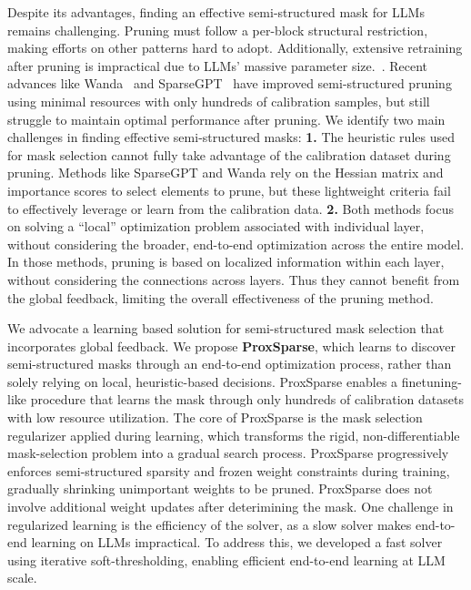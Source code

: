 Despite its advantages, finding an effective semi-structured mask for LLMs remains challenging. Pruning must follow a per-block structural restriction, making efforts on other patterns hard to adopt. Additionally, extensive retraining after pruning is impractical due to LLMs' massive parameter size.~\cite{ma2023llm}. Recent advances like Wanda~\cite{sun2023simple} and SparseGPT~\cite{frantar2023sparsegpt} have improved semi-structured pruning using minimal resources with only hundreds of calibration samples, but still struggle to maintain optimal performance after pruning. 
We identify two main challenges in finding effective semi-structured masks: \textbf{1.} The heuristic rules used for mask selection cannot fully take advantage of the calibration dataset during pruning. Methods like SparseGPT and Wanda rely on the Hessian matrix and importance scores to select elements to prune, but these lightweight criteria fail to effectively leverage or learn from the calibration data. \textbf{2.} Both methods focus on solving a ``local'' optimization problem associated with individual layer, without considering the broader, end-to-end optimization across the entire model. In those methods, pruning is based on localized information within each layer, without considering the connections across layers. Thus they cannot benefit from the global feedback, limiting the overall effectiveness of the pruning method.

We advocate a learning based solution for semi-structured mask selection that incorporates global feedback. We propose \textbf{ProxSparse}, which learns to discover semi-structured masks through an end-to-end optimization process, rather than solely relying on local, heuristic-based decisions. 
ProxSparse enables a finetuning-like procedure that learns the mask through only hundreds of calibration datasets with low resource utilization.
The core of ProxSparse is the mask selection regularizer applied during learning, which transforms the rigid, non-differentiable mask-selection problem into a gradual search process. ProxSparse progressively enforces semi-structured sparsity and frozen weight constraints during training, gradually shrinking unimportant weights to be pruned. ProxSparse does not involve additional weight updates after deterimining the mask. 
One challenge in regularized learning is the efficiency of the solver, as a slow solver makes end-to-end learning on LLMs impractical. To address this, we developed a fast solver using iterative soft-thresholding, enabling efficient end-to-end learning at LLM scale.



